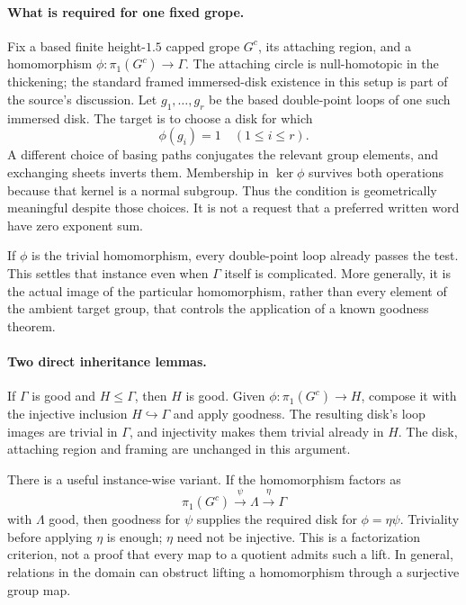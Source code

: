 \documentclass[11pt]{article}
\begin{document}
\paragraph{What is required for one fixed grope.}
Fix a based finite height-$1.5$ capped grope $G^c$, its attaching region,
and a homomorphism $\phi:\pi_1(G^c)\to\Gamma$. The attaching circle
is null-homotopic in the thickening; the standard framed immersed-disk
existence in this setup is part of the source's discussion. Let
$g_1,\ldots,g_r$ be the based double-point loops of one such immersed
disk. The target is to choose a disk for which
\[
                        \phi(g_i)=1\quad(1\le i\le r).
\]
A different choice of basing paths conjugates the relevant group elements,
and exchanging sheets inverts them. Membership in $\ker\phi$ survives
both operations because that kernel is a normal subgroup. Thus the
condition is geometrically meaningful despite those choices. It is
not a request that a preferred written word have zero exponent sum.

If $\phi$ is the trivial homomorphism, every double-point loop already
passes the test. This settles that instance even when $\Gamma$ itself
is complicated. More generally, it is the actual image of the particular
homomorphism, rather than every element of the ambient target group,
that controls the application of a known goodness theorem.

\paragraph{Two direct inheritance lemmas.}
If $\Gamma$ is good and $H\le\Gamma$, then $H$ is good. Given
$\phi:\pi_1(G^c)\to H$, compose it with the injective inclusion
$H\hookrightarrow\Gamma$ and apply goodness. The resulting disk's
loop images are trivial in $\Gamma$, and injectivity makes them
trivial already in $H$. The disk, attaching region and framing are
unchanged in this argument.

There is a useful instance-wise variant. If the homomorphism factors
as
\[
 \pi_1(G^c)\xrightarrow{\psi}\Lambda
                       \xrightarrow{\eta}\Gamma
\]
with $\Lambda$ good, then goodness for $\psi$ supplies the required
disk for $\phi=\eta\psi$. Triviality before applying $\eta$ is enough;
$\eta$ need not be injective. This is a factorization criterion, not a
proof that every map to a quotient admits such a lift. In general,
relations in the domain can obstruct lifting a homomorphism through
a surjective group map.
\end{document}

